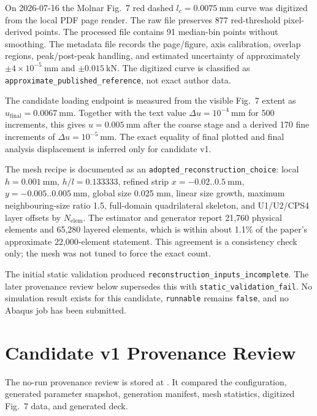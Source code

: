 \documentclass[11pt,a4paper]{article}
\begin{document}
On 2026-07-16 the Molnar Fig.~7 red dashed \(l_c=0.0075\ \mathrm{mm}\) curve was digitized from the local PDF page render. The raw file  preserves 877 red-threshold pixel-derived points. The processed file  contains 91 median-bin points without smoothing. The metadata file records the page/figure, axis calibration, overlap regions, peak/post-peak handling, and estimated uncertainty of approximately \(\pm 4\times10^{-5}\ \mathrm{mm}\) and \(\pm 0.015\ \mathrm{kN}\). The digitized curve is classified as \texttt{approximate\_published\_reference}, not exact author data.

The candidate loading endpoint is measured from the visible Fig.~7 extent as \(u_\mathrm{final}=0.0067\ \mathrm{mm}\). Together with the text value \(\Delta u=10^{-4}\ \mathrm{mm}\) for 500 increments, this gives \(u=0.005\ \mathrm{mm}\) after the coarse stage and a derived 170 fine increments of \(\Delta u=10^{-5}\ \mathrm{mm}\). The exact equality of final plotted and final analysis displacement is inferred only for candidate v1.

The mesh recipe is documented as an \texttt{adopted\_reconstruction\_choice}: local \(h=0.001\ \mathrm{mm}\), \(h/l=0.133333\), refined strip \(x=-0.02..0.5\ \mathrm{mm}\), \(y=-0.005..0.005\ \mathrm{mm}\), global size 0.025 mm, linear size growth, maximum neighbouring-size ratio 1.5, full-domain quadrilateral skeleton, and U1/U2/CPS4 layer offsets by \(N_\mathrm{elem}\). The estimator and generator report 21,760 physical elements and 65,280 layered elements, which is within about 1.1\% of the paper's approximate 22,000-element statement. This agreement is a consistency check only; the mesh was not tuned to force the exact count.

The initial static validation produced \texttt{reconstruction\_inputs\_incomplete}. The later provenance review below supersedes this with \texttt{static\_validation\_fail}. No simulation result exists for this candidate, \texttt{runnable} remains \texttt{false}, and no Abaqus job has been submitted.

\section{Candidate v1 Provenance Review}

The no-run provenance review is stored at . It compared the configuration, generated parameter snapshot, generation manifest, mesh statistics, digitized Fig.~7 data, and generated deck.
\end{document}
